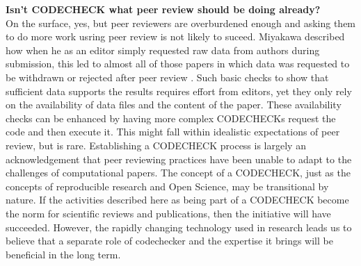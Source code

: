 \documentclass[12pt]{article}
\begin{document}
\textbf{Isn't CODECHECK what peer review should be doing already?} \\
On the surface, yes, but peer reviewers are overburdened enough and
asking them to do more work usring peer review is not likely to
suceed.  Miyakawa described how when he as an editor simply requested
raw data from authors during submission, this led to almost all of
those papers in which data was requested to be withdrawn or rejected
after peer review \cite{miyakawa_no_2020}.  Such basic checks to show
that sufficient data supports the results requires effort from
editors, yet they only rely on the availability of data files and the
content of the paper.  These availability checks can be enhanced by
having more complex CODECHECKs request the code and then execute it.
This might fall within idealistic expectations of peer review, but is
rare.  Establishing a CODECHECK process is largely an acknowledgement
that peer reviewing practices have been unable to adapt to the
challenges of computational papers.  The concept of a CODECHECK, just
as the concepts of reproducible research and Open Science, may be
transitional by nature. If the activities described here as being part
of a CODECHECK become the norm for scientific reviews and
publications, then the initiative will have succeeded. However, the
rapidly changing technology used in research leads us to believe that
a separate role of codechecker and the expertise it brings will be
beneficial in the long term.

\newpage
\end{document}
